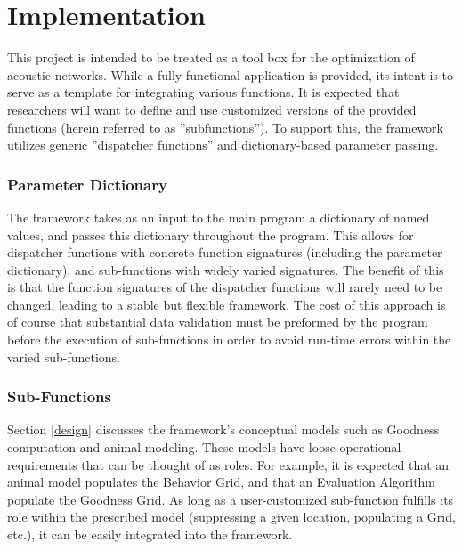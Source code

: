 \chapter{Implementation}
\label{implementation}
This project is intended to be treated as a tool box for the optimization of acoustic networks.  While a fully-functional application is provided, its intent is to serve as a template for integrating various functions.  It is expected that researchers will want to define and use customized versions of the provided functions (herein referred to as ''subfunctions'').  To support this, the framework utilizes generic ''dispatcher functions'' and dictionary-based parameter passing.  

\subsection{Parameter Dictionary}
\label{parameterDictionary}
The framework takes as an input to the main program a dictionary of named values, and passes this dictionary throughout the program.  This allows for dispatcher functions with concrete function signatures (including the parameter dictionary), and sub-functions with widely varied signatures.  The benefit of this is that the function signatures of the dispatcher functions will rarely need to be changed, leading to a stable but flexible framework. The cost of this approach is of course that substantial data validation must be preformed by the program before the execution of sub-functions in order to avoid run-time errors within the varied sub-functions.  


\subsection{Sub-Functions}
\label{sub-functions}
Section \ref{design} discusses the framework's conceptual models such as Goodness computation and animal modeling.  These models have loose operational requirements that can be thought of as roles.  For example, it is expected that an animal model populates the Behavior Grid, and that an Evaluation Algorithm populate the Goodness Grid.  As long as a user-customized sub-function fulfills its role within the prescribed model (suppressing a given location, populating a Grid, etc.), it can be easily integrated into the framework.

